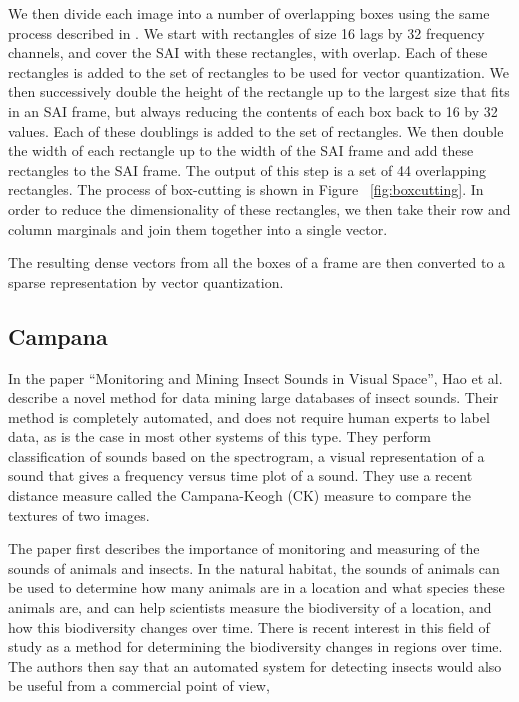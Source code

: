 \documentclass[12pt,oneside]{book}
\begin{document}
We then divide each image into a number of overlapping boxes using the
same process described in \cite{lyon10}.  We start with rectangles of
size 16 lags by 32 frequency channels, and cover the SAI with these
rectangles, with overlap.  Each of these rectangles is added to the
set of rectangles to be used for vector quantization.  We then
successively double the height of the rectangle up to the largest size
that fits in an SAI frame, but always reducing the contents of each
box back to 16 by 32 values.  Each of these doublings is added to the
set of rectangles.  We then double the width of each rectangle up to
the width of the SAI frame and add these rectangles to the SAI frame.
The output of this step is a set of 44 overlapping rectangles. The
process of box-cutting is shown in Figure ~\ref{fig:boxcutting}. In
order to reduce the dimensionality of these rectangles, we then take
their row and column marginals and join them together into a single
vector.

The resulting dense vectors from all the boxes of a frame are then
converted to a sparse representation by vector quantization.

\subsection{Campana}

In the paper ``Monitoring and Mining Insect Sounds in Visual
Space''\cite{hao12}, Hao et al. describe a novel method for data
mining large databases of insect sounds.  Their method is completely
automated, and does not require human experts to label data, as is the
case in most other systems of this type.  They perform classification
of sounds based on the spectrogram, a visual representation of a sound
that gives a frequency versus time plot of a sound.  They use a recent
distance measure called the Campana-Keogh (CK) measure to compare the
textures of two images.

The paper first describes the importance of monitoring and measuring
of the sounds of animals and insects.  In the natural habitat, the
sounds of animals can be used to determine how many animals are in a
location and what species these animals are, and can help scientists
measure the biodiversity of a location, and how this biodiversity
changes over time.  There is recent interest in this field of study
\cite{wimmer2010} \cite{seuer2008} as a method for determining the
biodiversity changes in regions over time.  The authors then say that
an automated system for detecting insects would also be useful from a
commercial point of view,
\end{document}
